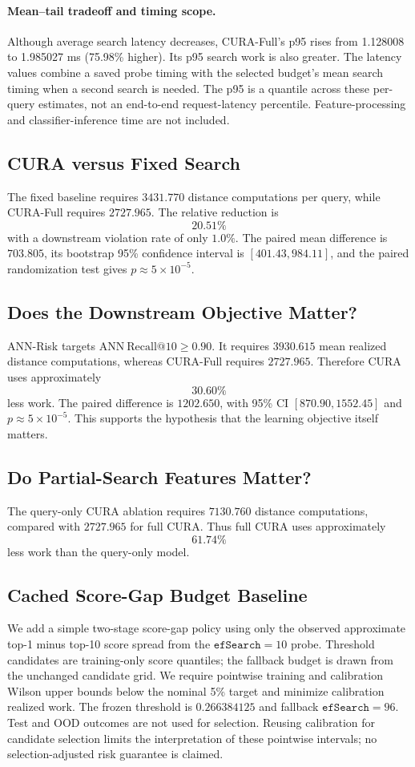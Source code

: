 \documentclass[10pt,twocolumn]{article}
\newcommand{\cura}{CURA}
\newcommand{\ef}{\texttt{efSearch}}
\begin{document}
\paragraph{Mean--tail tradeoff and timing scope.}
Although average search latency decreases, CURA-Full's p95 rises from 1.128008 to 1.985027 ms (75.98\% higher). Its p95 search work is also greater. The latency values combine a saved probe timing with the selected budget's mean search timing when a second search is needed. The p95 is a quantile across these per-query estimates, not an end-to-end request-latency percentile. Feature-processing and classifier-inference time are not included.

\subsection{CURA versus Fixed Search}
The fixed baseline requires $3431.770$ distance computations per query, while \cura{}-Full requires $2727.965$. The relative reduction is
\[
\boxed{20.51\%}
\]
with a downstream violation rate of only $1.0\%$. The paired mean difference is $703.805$, its bootstrap 95\% confidence interval is $[401.43,984.11]$, and the paired randomization test gives $p\approx5\times10^{-5}$.

\subsection{Does the Downstream Objective Matter?}
ANN-Risk targets $\mathrm{ANN\ Recall}@10\ge0.90$. It requires $3930.615$ mean realized distance computations, whereas \cura{}-Full requires $2727.965$. Therefore \cura{} uses approximately
\[
\boxed{30.60\%}
\]
less work. The paired difference is $1202.650$, with 95\% CI $[870.90,1552.45]$ and $p\approx5\times10^{-5}$. This supports the hypothesis that the learning objective itself matters.

\subsection{Do Partial-Search Features Matter?}
The query-only \cura{} ablation requires $7130.760$ distance computations, compared with $2727.965$ for full \cura{}. Thus full \cura{} uses approximately
\[
\boxed{61.74\%}
\]
less work than the query-only model.

\subsection{Cached Score-Gap Budget Baseline}
We add a simple two-stage score-gap policy using only the observed approximate top-1 minus top-10 score spread from the $\ef=10$ probe. Threshold candidates are training-only score quantiles; the fallback budget is drawn from the unchanged candidate grid. We require pointwise training and calibration Wilson upper bounds below the nominal 5\% target and minimize calibration realized work. The frozen threshold is $0.266384125$ and fallback $\ef=96$. Test and OOD outcomes are not used for selection. Reusing calibration for candidate selection limits the interpretation of these pointwise intervals; no selection-adjusted risk guarantee is claimed.
\end{document}
